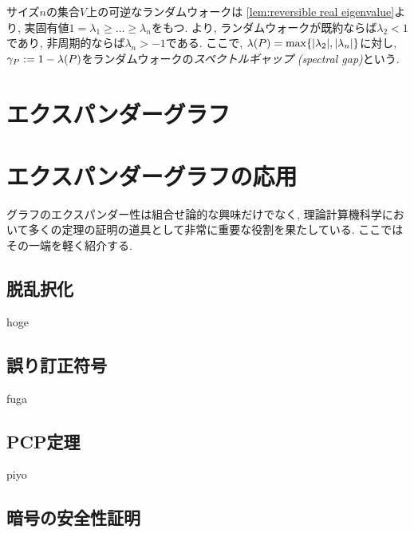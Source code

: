 サイズ$n$の集合$V$上の可逆なランダムウォークは
\cref{lem:reversible real eigenvalue}より,
実固有値$1=\lambda_1 \ge \dots \ge \lambda_n$をもつ.
より,
ランダムウォークが既約ならば$\lambda_2<1$であり,
非周期的ならば$\lambda_n > -1$である.
ここで, $\lambda(P)=\max\{\lvert\lambda_2\rvert,\lvert\lambda_n\rvert\}$に対し,
$\gamma_P \mathrel{:=} 1 - \lambda(P)$をランダムウォークの\emph{スペクトルギャップ (spectral gap)}という.

\section{エクスパンダーグラフ}

\section{エクスパンダーグラフの応用}
グラフのエクスパンダー性は組合せ論的な興味だけでなく,
理論計算機科学において多くの定理の証明の道具として非常に重要な役割を果たしている.
ここではその一端を軽く紹介する.
\subsection{脱乱択化}
hoge
\subsection{誤り訂正符号}
fuga
\subsection{PCP定理}
piyo
\subsection{暗号の安全性証明}
